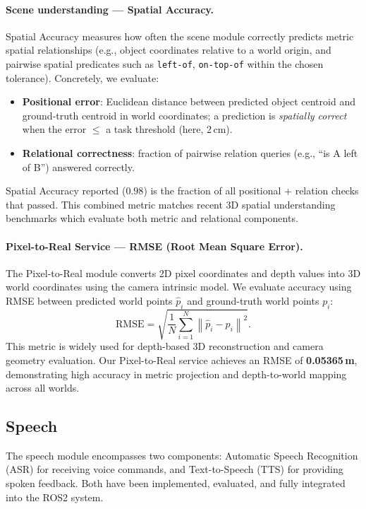 \documentclass[12pt]{extarticle}
\begin{document}
\paragraph{Scene understanding — Spatial Accuracy.}
Spatial Accuracy measures how often the scene module correctly predicts metric spatial relationships (e.g., object coordinates relative to a world origin, and pairwise spatial predicates such as \texttt{left-of}, \texttt{on-top-of} within the chosen tolerance). Concretely, we evaluate:
\begin{itemize}
  \item \textbf{Positional error}: Euclidean distance between predicted object centroid and ground-truth centroid in world coordinates; a prediction is \emph{spatially correct} when the error $\leq$ a task threshold (here, 2\,cm).
  \item \textbf{Relational correctness}: fraction of pairwise relation queries (e.g., ``is A left of B'') answered correctly.
\end{itemize}
Spatial Accuracy reported ($0.98$) is the fraction of all positional + relation checks that passed. This combined metric matches recent 3D spatial understanding benchmarks which evaluate both metric and relational components. \cite{daxberger2025mmspatial,zhao2023vsd}


\paragraph{Pixel-to-Real Service — RMSE (Root Mean Square Error).}
The Pixel-to-Real module converts 2D pixel coordinates and depth values into 3D world coordinates using the camera intrinsic model. We evaluate accuracy using RMSE between predicted world points $\hat{p}_i$ and ground-truth world points $p_i$:
\[
\mathrm{RMSE} = 
\sqrt{
\frac{1}{N} \sum_{i=1}^{N} 
\left\| \hat{p}_i - p_i \right\|^{2}
}.
\]
This metric is widely used for depth-based 3D reconstruction and camera geometry evaluation. \cite{yin2021learning,teed2020raft3d}  
Our Pixel-to-Real service achieves an RMSE of \textbf{0.05365\,m}, demonstrating high accuracy in metric projection and depth-to-world mapping across all worlds.


\subsection{Speech}

The speech module encompasses two components: Automatic Speech Recognition (ASR) for receiving voice commands, and Text-to-Speech (TTS) for providing spoken feedback. Both have been implemented, evaluated, and fully integrated into the ROS2 system.
\end{document}
